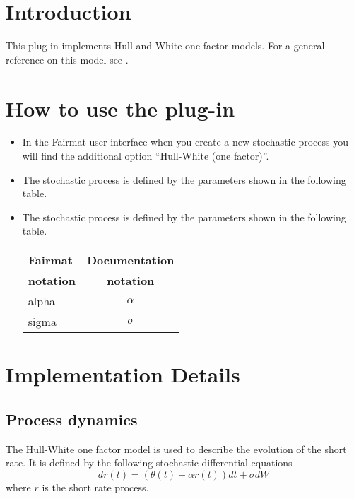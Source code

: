 \newcommand{\pluginName}{Hull-White one factor model}
\newcommand{\pluginVersion}{1.0.15}



\section{Introduction}
This plug-in implements Hull and White one factor models. For a general reference on this model see \cite{Hull:OptFutDer}.

\section{How to use the plug-in}

\begin{itemize}
  \item In the Fairmat user interface when you create a new stochastic process you will find the additional option ``Hull-White (one factor)''.
  \item The stochastic process is defined by the parameters shown in the following table.
\item The stochastic process is defined by the parameters shown in the following table.

\begin{center}
\begin{tabular}{|l|c|}
	\hline
	\textbf{Fairmat}&\textbf{Documentation}\\
	\textbf{notation}&\textbf{notation}\\
	\hline
	alpha & $\alpha$\\
	sigma & $\sigma$\\
	\hline
\end{tabular}
\end{center}
\end{itemize}

\section{Implementation Details}

\subsection{Process dynamics}

The Hull-White one factor model is used to describe the evolution of the short rate. It is defined by the following stochastic differential equations
\begin{equation}
dr(t) = (\theta(t)-\alpha r(t))dt + \sigma dW
\end{equation}
where $r$ is the short rate process.

